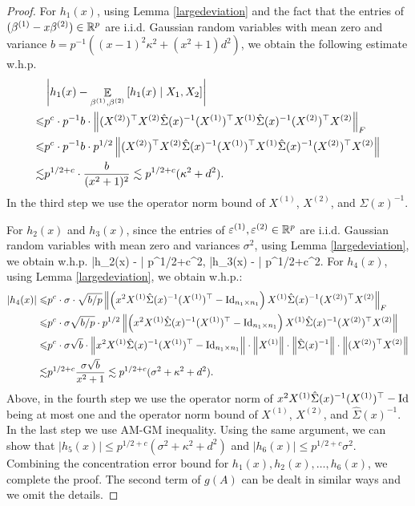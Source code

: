 \begin{proof}
For $h_1(x)$, using Lemma \ref{largedeviation} and the fact that the entries of $(\beta^{(1)}-x\beta^{(2)})\in \mathbb{R}^p$ are i.i.d. Gaussian random variables with mean zero and variance $b = p^{-1}((x-1)^2\kappa^2 + (x^2+1)d^2)$, we obtain the following estimate w.h.p.
\begin{align}
	&\left|h_1(x) - \mathop{\mathbb{E}}_{\beta^{(1)},\beta^{(2)}}\left[ h_1(x) \mid X_1, X_2 \right]\right|\nonumber \\
\leqslant& p^{c}\cdot p^{-1} b \cdot \left\| (X^{(2)})^\top X^{(2)}  \hat\Sigma(x)^{-1}  (X^{(1)})^\top X^{(1)} \hat\Sigma(x)^{-1} (X^{(2)})^\top X^{(2)} \right\|_F \nonumber\\
	\leqslant& p^{c}\cdot p^{-1} b \cdot p^{1/2} \left\| (X^{(2)})^\top X^{(2)}  \hat\Sigma(x)^{-1}  (X^{(1)})^\top X^{(1)} \hat\Sigma(x)^{-1} (X^{(2)})^\top X^{(2)} \right\| \nonumber \\
	\lesssim& p^{1/2+c}\cdot \frac{b}{(x^2+1)^2}\lesssim p^{1/2+c}(\kappa^2 + d^2).\label{eq_hA1}
\end{align}
In the third step we use the operator norm bound of $X^{(1)}$, $X^{(2)}$, and $\hat{\Sigma}(x)^{-1}$. %

For $h_2(x)$ and $h_3(x)$, since the entries of $\varepsilon^{(1)},\varepsilon^{(2)}\in \mathbb{R}^p$ are i.i.d. Gaussian random variables with mean zero and variances $\sigma^2$, using Lemma \ref{largedeviation}, we obtain w.h.p.
\be\label{eq_hA23}\left|h_2(x) - \right| \lesssim p^{1/2+c}\sigma^2, \quad \left|h_3(x) - \right| \lesssim p^{1/2+c}\sigma^2.\ee
For $h_4(x)$, using Lemma \ref{largedeviation}, we obtain w.h.p.:
\begin{align}
			\left|h_4(x)\right|
	\leqslant& p^{c}\cdot \sigma \cdot \sqrt{b / p}\left\| \left(x^2 X^{(1)}\hat\Sigma(x)^{-1} (X^{(1)})^\top-\operatorname{Id}_{n_1\times n_1}\right) X^{(1)} \hat\Sigma(x)^{-1} (X^{(2)})^\top X^{(2)} \right\|_F\nonumber \\
	\leqslant& p^{c}\cdot \sigma \sqrt{b / p} \cdot p^{1/2} \left\| \left(x^2 X^{(1)}\hat\Sigma(x)^{-1} (X^{(1)})^\top-\operatorname{Id}_{n_1\times n_1}\right) X^{(1)} \hat\Sigma(x)^{-1} (X^{(2)})^\top X^{(2)} \right\|  \nonumber\\
	\leqslant&  p^{c}\cdot \sigma \sqrt{b} \cdot \left\|  x^2 X^{(1)}\hat\Sigma(x)^{-1} (X^{(1)})^\top - \operatorname{Id}_{n_1\times n_1} \right\| \cdot \left\|X^{(1)}\right\| \cdot \left\|\hat\Sigma(x)^{-1}\right\| \cdot \left\| (X^{(2)})^\top X^{(2)} \right\|  \nonumber\\
	\lesssim& p^{1/2+c}\frac{\sigma \sqrt{b}}{x^2+1} \lesssim p^{1/2+c}(\sigma^2 + \kappa^2 + d^2).\label{eq_hA4}
\end{align}
Above, in the fourth step we use the operator norm of $x^2 X^{(1)}\hat\Sigma(x)^{-1} (X^{(1)})^\top - \operatorname{Id}$ being at most one and the operator norm bound of $X^{(1)}$, $X^{(2)}$, and $\hat{\Sigma}(x)^{-1}$.
In the last step we use AM-GM inequality. Using the same argument, we can show that
$\left|h_5(x)\right| \le p^{1/2+c}(\sigma^2 + \kappa^2 + d^2)$ and $\left|h_6(x)\right| \le p^{1/2+c}\sigma^2$.
Combining the concentration error bound for $h_1(x), h_2(x), \dots, h_6(x)$, we complete the proof.
The second term of $g(A)$ can be dealt in similar ways and we omit the details.
\end{proof}

